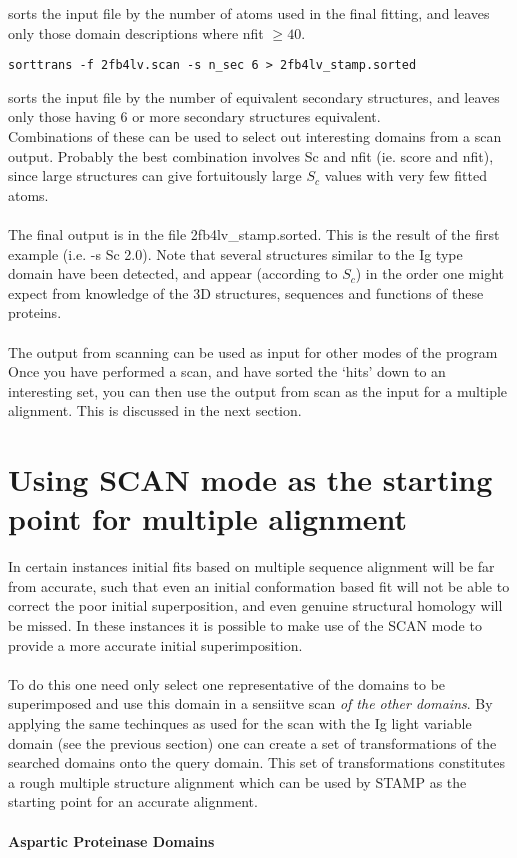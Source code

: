 sorts the input file by the number of atoms used in the final
fitting, and leaves only those domain descriptions where nfit $\geq 40$.\\

\begin{scriptsize}\begin{verbatim}
sorttrans -f 2fb4lv.scan -s n_sec 6 > 2fb4lv_stamp.sorted 
\end{verbatim} \end{scriptsize}

sorts the input file by the number of equivalent secondary 
structures, and leaves only those having $6$ or more secondary
structures equivalent.\\

Combinations of these can be used to select out interesting domains
from a scan output.  Probably the best combination involves Sc and
nfit (ie. score and nfit), since large structures can give
fortuitously large $S_{c}$ values with very few fitted atoms.\\
\\
The final output is in the file 2fb4lv\_stamp.sorted.  This is
the result of the first example (i.e. -s Sc 2.0).
Note that several structures similar to the Ig type domain have
been detected, and appear (according to $S_{c}$) in the order one 
might expect from knowledge of the 3D structures, sequences and
functions of these proteins.    \\
\\
The output from scanning can be used as input for other modes of
the program  Once you have performed a scan, and have sorted the 
`hits' down to an interesting set, you can then use the output from 
scan as the input for a multiple alignment. This is discussed in the next section.  
\\

\section{Using SCAN mode as the starting point for multiple alignment}
\label{scan_example}
In certain instances initial fits based on multiple sequence
alignment will be far from accurate, such that even an initial
conformation based fit will not be able to correct the poor
initial superposition, and even genuine structural homology will
be missed.  In these instances it is possible to make use of the
SCAN mode to provide a more accurate initial superimposition.\\
\\
To do this one need only select one representative of the
domains to be superimposed and use this domain in a sensiitve
scan {\em of the other domains}.  By applying the same techinques as
used for the scan with the Ig light variable domain (see the previous section) one
can create a set of transformations of the searched domains onto the query domain. 
This set of transformations constitutes a rough multiple structure alignment which
can be used by STAMP as the starting point for an accurate alignment.\\
\\
{\bf Aspartic Proteinase Domains}\\
\\

